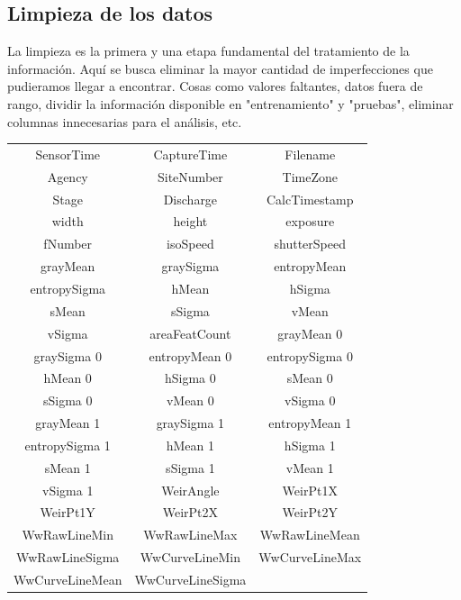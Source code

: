 \documentclass{article}
\begin{document}
    \subsection{Limpieza de los datos}

        La limpieza es la primera y una etapa fundamental del tratamiento de la información. Aquí se busca eliminar la mayor cantidad de imperfecciones que pudieramos llegar a encontrar. Cosas como valores faltantes, datos fuera de rango, dividir la información disponible en "entrenamiento" y "pruebas", eliminar columnas innecesarias para el análisis, etc.\\

        \begin{center}
        \begin{tabular}{ |c|c|c|} 
        \hline
        SensorTime & CaptureTime & Filename\\ 
        Agency & SiteNumber & TimeZone\\ 
        Stage  & Discharge & CalcTimestamp\\ 
        width & height & exposure \\ 
        fNumber & isoSpeed  & shutterSpeed    \\ 
        grayMean & graySigma & entropyMean   \\ 
        entropySigma & hMean & hSigma  \\ 
        sMean & sSigma & vMean  \\ 
        vSigma & areaFeatCount & grayMean 0 \\  
        graySigma 0  & entropyMean 0  & entropySigma 0 \\ 
        hMean 0      & hSigma 0     & sMean 0       \\ 
        sSigma 0     & vMean 0      & vSigma 0 \\ 
        grayMean 1   & graySigma 1  & entropyMean 1        \\ 
        entropySigma 1      & hMean 1      & hSigma 1      \\ 
        sMean 1      & sSigma 1     & vMean 1       \\ 
        vSigma 1     & WeirAngle    & WeirPt1X        \\ 
        WeirPt1Y       & WeirPt2X       & WeirPt2Y        \\ 
        WwRawLineMin   & WwRawLineMax   & WwRawLineMean \\ 
        WwRawLineSigma & WwCurveLineMin & WwCurveLineMax  \\ 
        WwCurveLineMean     & WwCurveLineSigma &      \\ 
        \hline
        \end{tabular}
        \end{center}
\end{document}
